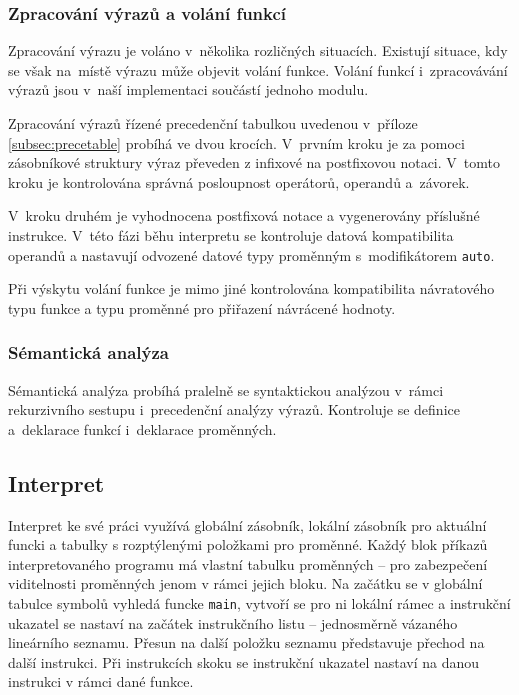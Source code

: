 \documentclass[a4paper, 12pt]{article}
\begin{document}
\subsubsection{Zpracování výrazů a volání funkcí}
Zpracování výrazu je voláno v~několika rozličných situacích. Existují situace,
kdy se však na~místě výrazu může objevit volání funkce. Volání funkcí i~zpracovávání
výrazů jsou v~naší implementaci součástí jednoho modulu.

Zpracování výrazů řízené precedenční tabulkou uvedenou v~příloze
\ref{subsec:precetable} probíhá ve dvou krocích. V~prvním kroku je za pomoci
zásobníkové struktury výraz převeden z infixové
na postfixovou notaci. V~tomto kroku je kontrolována správná posloupnost
operátorů, operandů a~závorek.

V~kroku druhém je vyhodnocena postfixová notace a vygenerovány příslušné instrukce.
V~této fázi běhu interpretu se kontroluje datová kompatibilita operandů a nastavují
odvozené datové typy proměnným s~modifikátorem \texttt{auto}.

Při výskytu volání funkce je mimo jiné kontrolována kompatibilita návratového
typu funkce a typu proměnné pro přiřazení návrácené hodnoty.

\subsubsection{Sémantická analýza}
Sémantická analýza probíhá pralelně se syntaktickou analýzou v~rámci
rekurzivního sestupu i~precedenční analýzy výrazů. Kontroluje se definice
a~deklarace funkcí i~deklarace proměnných.

\subsection{Interpret} \label{interpret}
Interpret ke své práci využívá globální zásobník, lokální zásobník pro aktuální
funcki a tabulky s rozptýlenými položkami pro proměnné. Každý blok příkazů
interpretovaného programu má vlastní tabulku proměnných -- pro zabezpečení viditelnosti
proměnných jenom v rámci jejich bloku.
Na začátku se v globální tabulce symbolů vyhledá funcke \texttt{main},
vytvoří se pro ni lokální rámec a instrukční ukazatel se nastaví na začátek
instrukčního listu -- jednosměrně vázaného lineárního seznamu.
Přesun na další položku seznamu představuje přechod na další instrukci.
Při instrukcích skoku se instrukční ukazatel nastaví
na danou instrukci v rámci dané funkce.
\end{document}
